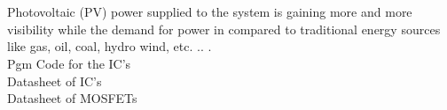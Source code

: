 \documentclass[12 pt, oneside]{book}
\begin{document}
\clearpage
{}
\chapter*{}


Photovoltaic (PV) power supplied to the system is gaining more and more visibility while the demand for power in compared to traditional energy sources like gas, oil, coal, hydro wind, etc.  .. . \\

Pgm Code for the IC's\\

Datasheet of IC's\\

Datasheet of MOSFETs









\end{document}
